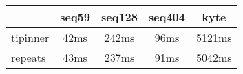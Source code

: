\begin{tabular}{|l|c|c|c|c|}
\hline
 & seq59 & seq128 & seq404  & kyte \\
\hline
tipinner &  42ms &  242ms &  96ms &  5121ms\\
\hline
repeats &  43ms &  237ms &  91ms &  5042ms\\
\hline
\end{tabular}

